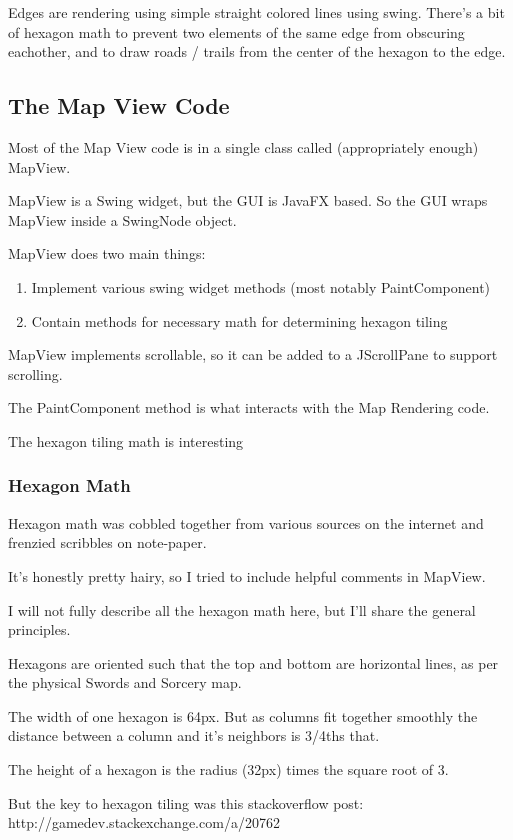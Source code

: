 \documentclass[12pt,a4paper]{article}
\begin{document}
Edges are rendering using simple straight colored lines using swing.
There's a bit of hexagon math to prevent two elements of the same edge
from obscuring eachother, and to draw roads / trails from the center of the
hexagon to the edge.


\subsection{The Map View Code}
Most of the Map View code is in a single class called (appropriately enough)
MapView.

MapView is a Swing widget, but the GUI is JavaFX based. So the GUI wraps
MapView inside a SwingNode object.

MapView does two main things:
\begin{enumerate}
\item{Implement various swing widget methods (most notably PaintComponent)}
\item{Contain methods for necessary math for determining hexagon tiling}
\end{enumerate}

MapView implements scrollable, so it can be added to a JScrollPane to support
scrolling.

The PaintComponent method is what interacts with the Map Rendering code.

The hexagon tiling math is interesting

\subsubsection{Hexagon Math}

Hexagon math was cobbled together from various sources on the internet and
frenzied scribbles on note-paper. 

It's honestly pretty hairy, so I tried to include helpful comments in
MapView.

I will not fully describe all the hexagon math here, but I'll share the general
principles.

Hexagons are oriented such that the top and bottom are horizontal lines,
as per the physical Swords and Sorcery map.

The width of one hexagon is 64px. But as columns fit together
smoothly the distance between a column and it's neighbors is 3/4ths that.

The height of a hexagon is the radius (32px) times the square root of 3.

But the key to hexagon tiling was this stackoverflow post:
http://gamedev.stackexchange.com/a/20762
\end{document}
